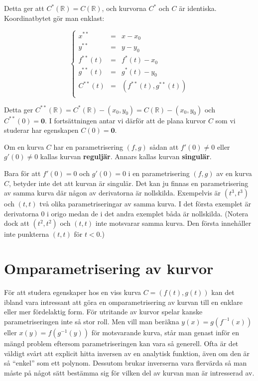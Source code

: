 Detta ger att $C^*(\mathbb{R}) = C(\mathbb{R})$, och kurvorna $C^*$ och $C$ är identiska. Koordinatbytet gör man enklast:

\begin{equation*}
\left\{
\begin{array}{lll}
x^{**} & = & x-x_0 \\
y^{**} & = & y-y_0 \\
f^{**}(t) & = & f^*(t)-x_0 \\
g^{**}(t) & = & g^*(t)-y_0 \\
C^{**}(t) & = & (f^{**}(t),g^{**}(t)) \\
\end{array}
\right.
\end{equation*}

Detta ger $C^{**}(\mathbb{R}) = C^*(\mathbb{R}) - (x_0, y_0) = C(\mathbb{R}) - (x_0, y_0)$ och $C^{**}(0) = \mathbf{0}$. I fortsättningen antar vi därför att de plana kurvor $C$ som vi studerar har egenskapen $C(0) = \mathbf{0}$.


\begin{Definition}
Om en kurva $C$ har en parametrisering $(f, g)$ sådan att $f'(0) \neq 0$ eller $g'(0) \neq 0$ kallas kurvan \textbf{reguljär}. Annars kallas kurvan \textbf{singulär}.
\end{Definition}

Bara för att $f'(0) = 0$ och $g'(0) = 0$ i en parametrisering $(f, g)$ av en
kurva $C$, betyder inte det att kurvan är singulär. Det kan ju finnas en parametrisering av samma kurva där någon av derivatorna är nollskilda. Exempelvis är $(t^3, t^3)$ och $(t, t)$ två olika parametriseringar av samma kurva. I det första exemplet är derivatorna $0$ i origo medan de i det andra
exemplet båda är nollskilda. (Notera dock att $(t^2, t^2)$ och $(t, t)$ inte motsvarar samma kurva. Den första innehåller inte punkterna $(t, t)$ för $t < 0$.)

\section{Omparametrisering av kurvor}

För att studera egenskaper hos en viss kurva $C = (f(t), g(t))$ kan det ibland vara intressant att göra en omparametrisering av kurvan till en enklare eller mer fördelaktig form. För utritande av kurvor spelar kanske parametriseringen inte så stor roll. Men vill man beräkna $y(x) = g(f^{-1}(x))$ eller $x(y) = f(g^{-1}(y))$ för motsvarande kurva, står man genast inför en mängd problem eftersom parametriseringen kan vara så generell. Ofta är det väldigt svårt att explicit hitta inversen av en analytisk funktion, även om den är så ``enkel'' som ett polynom. Dessutom brukar inverserna vara flervärda så man måste på något sätt bestämma sig för vilken del av kurvan man är intresserad av.

